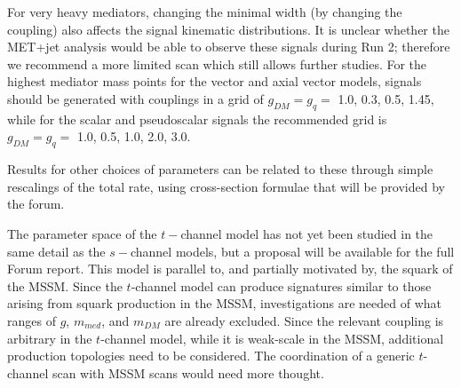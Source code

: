 \documentclass[a4,debug,notitlepage,nobib]{tufte-handout}
\newcommand{\mdm}{\ensuremath{m_{DM}}\xspace}
\newcommand{\mmed}{\ensuremath{m_{med}}\xspace}
\newcommand{\gq}{\ensuremath{g_{q}}\xspace}
\begin{document}
For very heavy mediators, changing
the minimal width (by changing the coupling) also affects the signal
kinematic distributions. It is unclear whether the MET+jet analysis
would be able to observe these signals during Run 2; therefore we
recommend a more limited scan which still allows further studies.
For the highest mediator mass points for the vector and axial vector models, 
signals should be generated with couplings in a grid of $g_{DM} = g_{q} = $ 1.0, 0.3, 0.5, 1.45,
while for the scalar and pseudoscalar signals the recommended grid is
$g_{DM} = g_{q} = $ 1.0, 0.5, 1.0, 2.0, 3.0.




Results for other choices of parameters can be related to
these through simple rescalings of the total rate, using cross-section
formulae that will be provided by the forum.

The parameter space of the $t-$channel model 
has not yet been studied in the same detail as the
$s-$channel models, but a proposal will be available for the full Forum report. 
This model is parallel to, and partially motivated by, the
squark of the MSSM. Since the $t$-channel model can produce signatures 
similar to those arising from squark production in the MSSM, investigations 
are needed of what ranges of $g$, \mmed, and \mdm are already excluded.
Since the relevant coupling is arbitrary in the $t$-channel model, while
it is weak-scale in the MSSM, additional production topologies need to
be considered. The coordination of a generic $t$-channel scan with
MSSM scans would need more thought.
\end{document}
